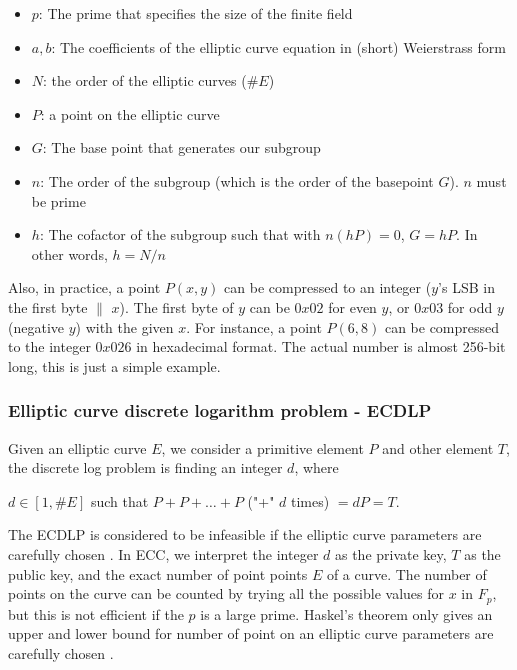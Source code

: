 \begin{itemize}
  \item$p$: The prime that specifies the size of the finite field
  \item$a, b$: The coefficients of the elliptic curve equation in (short) Weierstrass form
  \item$N$: the order of the elliptic curves ($\#E$)
  \item $P$: a point on the elliptic curve
        \item$G$: The base point that generates our subgroup
        \item$n$: The order of the subgroup (which is the order of the basepoint $G$). $n$ must be prime
        \item$h$: The cofactor of the subgroup such that with $n(hP)=0$, $G = hP$. In other words, $h=N/n$
\end{itemize}

Also, in practice, a point $P(x,y)$ can be compressed to an integer ($y$’s LSB in the first byte $\|$  $x$). The first byte of $y$ can be $0x02$ for even $y$, or $0x03$ for odd $y$(negative $y$) with the given $x$. For instance, a point $P(6, 8)$ can be compressed to the integer $0x026$ in hexadecimal format. The actual number is almost 256-bit long, this is just a simple example.

\subsubsection{Elliptic curve discrete logarithm problem - ECDLP}

Given an elliptic curve $E$, we consider a primitive element $P$ and other element $T$, the discrete log problem is finding an integer $d$, where
\begin{center}

$d \in [1, \#E]$ such that $P + P + … + P$ ("+" $d$ times) $= dP = T$.
\end{center}

The ECDLP is considered to be infeasible if the elliptic curve parameters are carefully chosen \cite{DBLP:journals/iacr/BosCLN14}. In ECC, we interpret the integer $d$ as the private key, $T$ as the public key, and the exact number of point points $E$ of a curve. The number of points on the curve can be counted by trying all the possible values for $x$ in $F_p$, but this is not efficient if the $p$ is a large prime. Haskel’s theorem only gives an upper and lower bound for number of point on an elliptic curve parameters are carefully chosen \cite{DBLP:journals/iacr/BosCLN14}. 

